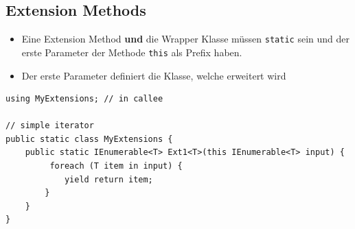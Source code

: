 \subsection{Extension Methods}
\begin{itemize}
	\item Eine Extension Method \textbf{und} die Wrapper Klasse müssen \lstinline|static| sein und der erste Parameter der Methode \lstinline|this| als Prefix haben. 
	\item Der erste Parameter definiert die Klasse, welche erweitert wird
\end{itemize}

\begin{lstlisting}
using MyExtensions; // in callee

// simple iterator
public static class MyExtensions {
	public static IEnumerable<T> Ext1<T>(this IEnumerable<T> input) {
		 foreach (T item in input) {
			yield return item;
		}
	}
}
\end{lstlisting}

\clearpage

